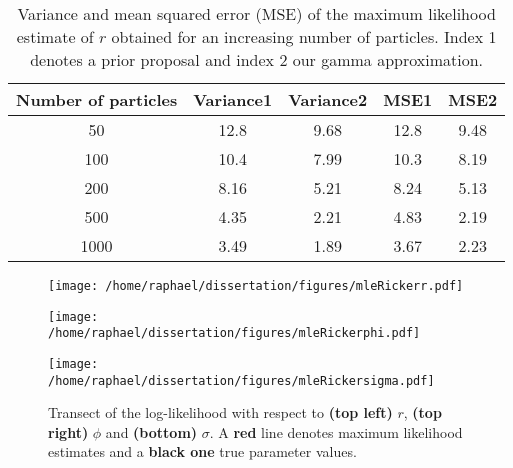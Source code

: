 \documentclass[12pt]{article}
\newcommand{\ra}[1]{\renewcommand{\arraystretch}{#1}}
\begin{document}
	\begin{table}[htb]
		\centering
		\vspace{5mm}
		\ra{1.3}
		\begin{tabular}{@{}ccccc@{}} \toprule
			Number of particles & Variance1 &  Variance2 & MSE1 & MSE2 \\ \midrule
			50 & 12.8 &  9.68 & 12.8 & 9.48\\ 
			100 & 10.4 & 7.99 & 10.3 & 8.19\\ 
			200 & 8.16 & 5.21 &  8.24 & 5.13\\ 
			500 & 4.35 & 2.21 & 4.83 & 2.19\\ 
			1000 & 3.49 & 1.89 & 3.67  & 2.23\\  \bottomrule
		\end{tabular}
		\caption[Variance and mean squared error of the MLE of $r$]{Variance and mean squared error (MSE) of the maximum likelihood estimate of $r$ obtained for an increasing number of particles. Index 1 denotes a prior proposal and index 2 our gamma approximation.}
		\label{table:mleR}
	\end{table}
	
	\begin{figure}[htb]
		\centering
		\begin{minipage}{0.6\textwidth}
			\centering
			\texttt{[image: /home/raphael/dissertation/figures/mleRickerr.pdf]}
		\end{minipage}
		\begin{minipage}{0.6\textwidth}
			\centering
			\texttt{[image: /home/raphael/dissertation/figures/mleRickerphi.pdf]}
		\end{minipage}
		\begin{minipage}{0.6\textwidth}
			\centering
			\texttt{[image: /home/raphael/dissertation/figures/mleRickersigma.pdf]}
		\end{minipage}
		\caption[Transect of the log-likelihood of the Ricker model.]{Transect of the log-likelihood with respect to \textbf{(top left)} $r$, \textbf{(top right)} $\phi$ and \textbf{(bottom)} $\sigma$. A \textbf{red} line denotes maximum likelihood estimates and a \textbf{black one} true parameter values.}
		\label{fig:transect}
	\end{figure}
	
\end{document}
